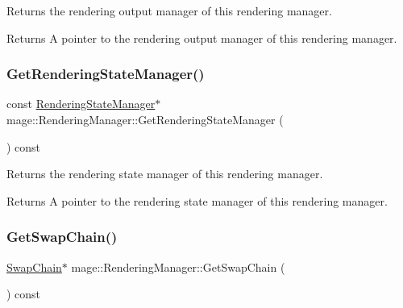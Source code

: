 Returns the rendering output manager of this rendering manager.

\begin{DoxyReturn}{Returns}
A pointer to the rendering output manager of this rendering manager. 
\end{DoxyReturn}
\hypertarget{classmage_1_1_rendering_manager_a762283c6474287a874f8e8667f69a165}{}\label{classmage_1_1_rendering_manager_a762283c6474287a874f8e8667f69a165} 
\subsubsection{\texorpdfstring{Get\+Rendering\+State\+Manager()}{GetRenderingStateManager()}}
{\footnotesize\ttfamily const \hyperlink{classmage_1_1_rendering_state_manager}{Rendering\+State\+Manager}$\ast$ mage\+::\+Rendering\+Manager\+::\+Get\+Rendering\+State\+Manager (\begin{DoxyParamCaption}{ }\end{DoxyParamCaption}) const\hspace{0.3cm}{\ttfamily [noexcept]}}

Returns the rendering state manager of this rendering manager.

\begin{DoxyReturn}{Returns}
A pointer to the rendering state manager of this rendering manager. 
\end{DoxyReturn}
\hypertarget{classmage_1_1_rendering_manager_a867d9d3986a38c98562cf0cfe9797fe0}{}\label{classmage_1_1_rendering_manager_a867d9d3986a38c98562cf0cfe9797fe0} 
\subsubsection{\texorpdfstring{Get\+Swap\+Chain()}{GetSwapChain()}}
{\footnotesize\ttfamily \hyperlink{classmage_1_1_swap_chain}{Swap\+Chain}$\ast$ mage\+::\+Rendering\+Manager\+::\+Get\+Swap\+Chain (\begin{DoxyParamCaption}{ }\end{DoxyParamCaption}) const\hspace{0.3cm}{\ttfamily [noexcept]}}

